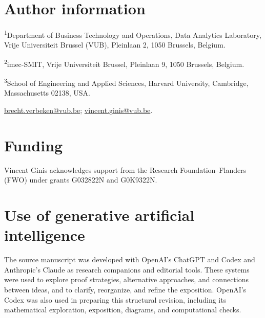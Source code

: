 \documentclass[11pt,a4paper]{article}
\theoremstyle{definition}
\theoremstyle{remark}
\numberwithin{equation}{section}
\begin{document}
\section*{Author information}
\noindent\textsuperscript{1}Department of Business Technology and Operations,
Data Analytics Laboratory, Vrije Universiteit Brussel (VUB),
Pleinlaan 2, 1050 Brussels, Belgium.\par
\noindent\textsuperscript{2}imec-SMIT, Vrije Universiteit Brussel,
Pleinlaan 9, 1050 Brussels, Belgium.\par
\noindent\textsuperscript{3}School of Engineering and Applied Sciences,
Harvard University, Cambridge, Massachusetts 02138, USA.\par
\noindent\href{mailto:brecht.verbeken@vub.be}{brecht.verbeken@vub.be};
\href{mailto:vincent.ginis@vub.be}{vincent.ginis@vub.be}.

\section*{Funding}
Vincent Ginis acknowledges support from the Research Foundation--Flanders
(FWO) under grants G032822N and G0K9322N.

\section*{Use of generative artificial intelligence}
The source manuscript was developed with OpenAI's ChatGPT and Codex
and Anthropic's Claude as research companions and editorial tools.
These systems were used to explore proof strategies, alternative
approaches, and connections between ideas, and to clarify, reorganize,
and refine the exposition. OpenAI's Codex was also used in preparing
this structural revision, including its mathematical exploration,
exposition, diagrams, and computational checks.

\end{document}

